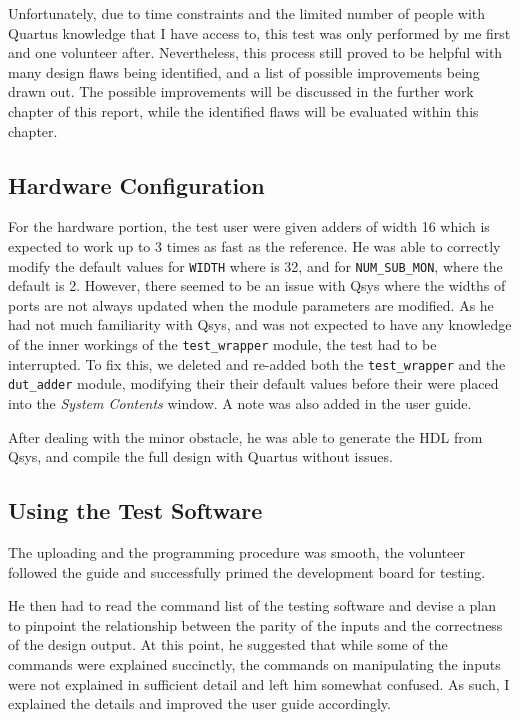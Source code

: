 Unfortunately, due to time constraints and the limited number of people with Quartus knowledge that I have access to, this test was only performed by me first and one volunteer after.
Nevertheless, this process still proved to be helpful with many design flaws being identified, and a list of possible improvements being drawn out.
The possible improvements will be discussed in the further work chapter of this report, while the identified flaws will be evaluated within this chapter.

\subsection{Hardware Configuration}
For the hardware portion, the test user were given adders of width 16 which is expected to work up to 3 times as fast as the reference.
He was able to correctly modify the default values for \texttt{WIDTH} where is 32, and for \texttt{NUM\_SUB\_MON}, where the default is 2.
However, there seemed to be an issue with Qsys where the widths of ports are not always updated when the module parameters are modified.
As he had not much familiarity with Qsys, and was not expected to have any knowledge of the inner workings of the \texttt{test\_wrapper} module, the test had to be interrupted.
To fix this, we deleted and re-added both the \texttt{test\_wrapper} and the \texttt{dut\_adder} module, modifying their their default values before their were placed into the \textit{System Contents} window.
A note was also added in the user guide.

After dealing with the minor obstacle, he was able to generate the HDL from Qsys, and compile the full design with Quartus without issues.

\subsection{Using the Test Software}
The uploading and the programming procedure was smooth, the volunteer followed the guide and successfully primed the development board for testing.

He then had to read the command list of the testing software and devise a plan to pinpoint the relationship between the parity of the inputs and the correctness of the design output.
At this point, he suggested that while some of the commands were explained succinctly, the commands on manipulating the inputs were not explained in sufficient detail and left him somewhat confused.
As such, I explained the details and improved the user guide accordingly.

